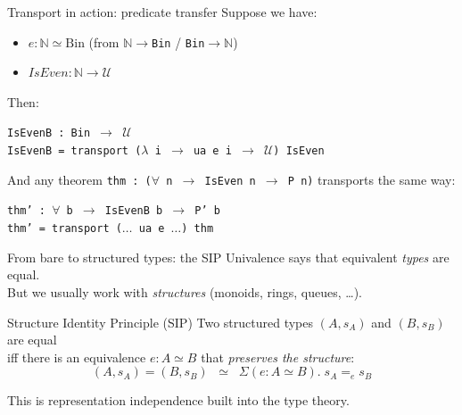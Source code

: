 \documentclass[aspectratio=169,12pt]{beamer}
\begin{document}
\begin{frame}{Transport in action: predicate transfer}
  Suppose we have:
  \begin{itemize}
    \item $e : \mathbb{N} \simeq \mathrm{Bin}$
      \quad (from \texttt{$\mathbb{N}\to$Bin} / \texttt{Bin$\to\mathbb{N}$})
    \item $\mathit{IsEven} : \mathbb{N} \to \mathcal{U}$
  \end{itemize}
  \pause\medskip
  Then:

  \medskip
  \texttt{IsEvenB : Bin $\to$ $\mathcal{U}$}\\
  \texttt{IsEvenB = transport ($\lambda$ i $\to$ ua e i $\to$ $\mathcal{U}$) IsEven}

  \pause\medskip
  And any theorem \texttt{thm : ($\forall$ n $\to$ IsEven n $\to$ P n)} transports the same way:

  \medskip
  \texttt{thm' : $\forall$ b $\to$ IsEvenB b $\to$ P' b}\\
  \texttt{thm' = transport ($\ldots$\ ua e $\ldots$) thm}

\end{frame}

\begin{frame}{From bare to structured types: the SIP}
  Univalence says that equivalent \emph{types} are equal. \\
  But we usually work with \emph{structures} (monoids, rings, queues, \ldots).
  \pause\bigskip

  \begin{block}{Structure Identity Principle (SIP)}
    Two structured types $(A, s_A)$ and $(B, s_B)$ are equal \\
    iff there is an equivalence $e : A \simeq B$ that \emph{preserves the structure}:
    \[
      (A, s_A) = (B, s_B)
      \;\;\simeq\;\;
      \Sigma(e : A \simeq B).\; s_A =_{e} s_B
    \]
  \end{block}
  \pause\medskip
  This is representation independence built into the type theory.
\end{frame}
\end{document}
